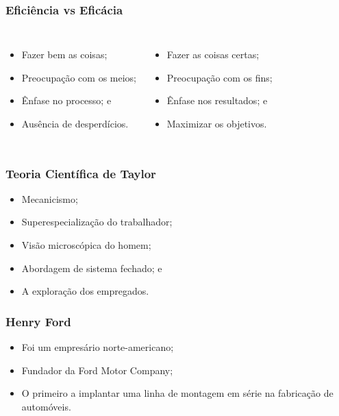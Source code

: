 \documentclass[aspectratio=169]{beamer}
\begin{document}
\begin{frame}
	\frametitle{Eficiência vs Eficácia}

\begin{columns}
		
	\begin{itemize}
		\item Fazer bem as coisas;
		\item Preocupa\c cão com os meios;
		\item Ênfase no processo; e
		\item Ausência de desperdícios.
	\end{itemize}


	\begin{itemize}
		\item Fazer as coisas certas;
		\item Preocupa\c cão com os fins;
		\item Ênfase nos resultados; e
		\item Maximizar os objetivos.
	\end{itemize}
\end{columns}

\end{frame}

\begin{frame}
	\frametitle{Teoria Científica de Taylor}

	\begin{itemize}
		\item Mecanicismo;
		\item Superespecializa\c cão do trabalhador;
		\item Visão microscópica do homem;
		\item Abordagem de sistema fechado; e
		\item A explora\c cão dos empregados.
	\end{itemize}
\end{frame}

\begin{frame}
	\frametitle{Henry Ford}

	\begin{itemize}
		\item Foi um empresário norte-americano;
		\item Fundador da Ford Motor Company;
		\item O primeiro a implantar uma linha de montagem em série na fabrica\c cão de automóveis.
	\end{itemize}
\end{frame}
\end{document}
